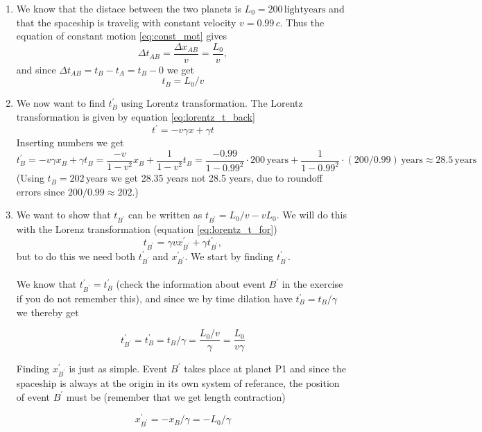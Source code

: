 \documentclass[a4paper,10pt,english]{article}
\begin{document}
\begin{enumerate}
\item We know that the distace between the two planets is $L_{0}=200\,\text{lightyears}$ and that the spaceship is travelig with constant velocity $v=0.99\,c$. Thus the equation of constant motion \ref{eq:const_mot} gives 
\[
\Delta t_{AB}=\frac{\Delta x_{AB}}{v}=\frac{L_{0}}{v},
\] 
and since $\Delta t_{AB}=t_{B}-t_{A}=t_{B}-0$ we get 
\[
t_{B}=L_{0}/v
\]
\item We now want to find $t^{\prime}_{B}$ using Lorentz transformation. The Lorentz transformation is given by equation \ref{eq:lorentz_t_back}
\[
t^{\prime}=-v\gamma x+\gamma t
\]
Inserting numbers we get
\[
t_{B}^{\prime}=-v\gamma x_{B}+\gamma t_{B}=\frac{-v}{1-v^{2}}x_{B}+\frac{1}{1-v^{2}}t_{B}=\frac{-0.99}{1-0.99^{2}}\cdot200\,\text{years}+\frac{1}{1-0.99^{2}}\cdot(200/0.99)\,\text{years}\approx28.5\,\text{years}
\]
(Using $t_{B}=202\,$years we get 28.35 years not 28.5 years, due to roundoff errors since $200/0.99\approx 202$.)
\item We want to show that $t_{B^{\prime}}$ can be written as $t_{B^{\prime}}=L_{0}/v-vL_{0}$. We will do this with the Lorenz transformation (equation \ref{eq:lorentz_t_for})
\[
t_{B^{\prime}}=\gamma vx^{\prime}_{B^{\prime}}+\gamma t^{\prime}_{B^{\prime}},
\]
but to do this we need both $t^{\prime}_{B^{\prime}}$ and $x^{\prime}_{B^{\prime}}$. We start by finding $t^{\prime}_{B^{\prime}}$.
\\ \\
We know that $t^{\prime}_{B^{\prime}}=t^{\prime}_{B}$ (check the information about event $B^{\prime}$ in the exercise if you do not remember this), and since we by time dilation have $t^{\prime}_{B}=t_{B}/\gamma$ we thereby get

\begin{equation}\label{eq:t_mark_B_mark}
t^{\prime}_{B^{\prime}}=t^{\prime}_{B}=t_{B}/\gamma=\frac{L_{0}/v}{\gamma}=\frac{L_{0}}{v\gamma}
\end{equation}

Finding $x^{\prime}_{B^{\prime}}$ is just as simple. Event $B^{\prime}$ takes place at planet P1 and since the spaceship is always at the origin in its own system of referance, the position of event $B^{\prime}$ must be (remember that we get length contraction)

\begin{equation}\label{eq:x_mark_B_mark}
x^{\prime}_{B^{\prime}}=-x_{B}/\gamma=-L_{0}/\gamma
\end{equation}


\end{enumerate}
\end{document}
